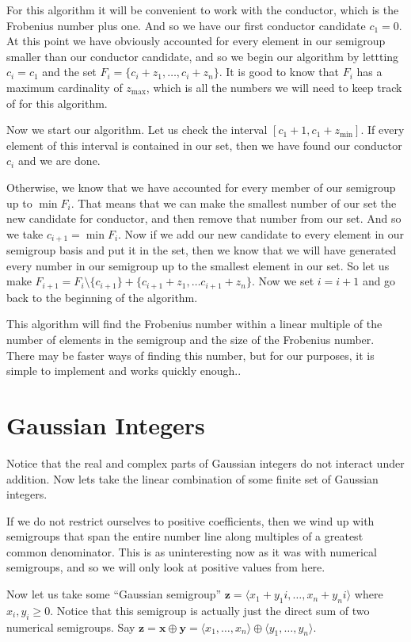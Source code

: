 \documentclass[11pt]{amsart}
\theoremstyle{plain}
\theoremstyle{definition}
\begin{document}
For this algorithm it will be convenient to work with the conductor, which is the Frobenius number plus one.
And so we have our first conductor candidate $c_1=0$.
At this point we have obviously accounted for every element in our semigroup smaller than our conductor candidate, and so we begin our algorithm by lettting $c_i=c_1$ and the set $F_i=\{c_i+z_1,\dots,c_i+z_n\}$.
It is good to know that $F_i$ has a maximum cardinality of $z_\text{max}$, which is all the numbers we will need to keep track of for this algorithm.

Now we start our algorithm.
Let us check the interval $[c_1+1,c_1+z_\text{min}]$.
If every element of this interval is contained in our set, then we have found our conductor $c_i$ and we are done.

Otherwise, we know that we have accounted for every member of our semigroup up to $\min F_i$. That means that we can make the smallest number of our set the new candidate for conductor, and then remove that number from our set. And so we take $c_{i+1}=\min F_i$. Now if we add our new candidate to every element in our semigroup basis and put it in the set, then we know that we will have generated every number in our semigroup up to the smallest element in our set. So let us make $F_{i+1}=F_i\setminus \{c_{i+1}\} + \{c_{i+1}+z_1,\dots c_{i+1}+z_n\}$. Now we set $i=i+1$ and go back to the beginning of the algorithm.

This algorithm will find the Frobenius number within a linear multiple of the number of elements in the semigroup and the size of the Frobenius number. There may be faster ways of finding this number, but for our purposes, it is simple to implement and works quickly enough.\cite{frobmask}.
\section{Gaussian Integers}
Notice that the real and complex parts of Gaussian integers do not interact under addition. Now lets take the linear combination of some finite set of Gaussian integers.

If we do not restrict ourselves to positive coefficients, then we wind up with semigroups that span the entire number line along multiples of a greatest common denominator. This is as uninteresting now as it was with numerical semigroups, and so we will only look at positive values from here.

Now let us take some ``Gaussian semigroup'' $\mathbf{z}=\langle x_1+y_1i,\dots,x_n+y_ni\rangle$ where $x_i,y_i\ge 0$. Notice that this semigroup is actually just the direct sum of two numerical semigroups. Say $\mathbf{z}=\mathbf{x}\oplus\mathbf{y}=\langle x_1,\dots,x_n\rangle\oplus\langle y_1,\dots,y_n\rangle$.
\end{document}
